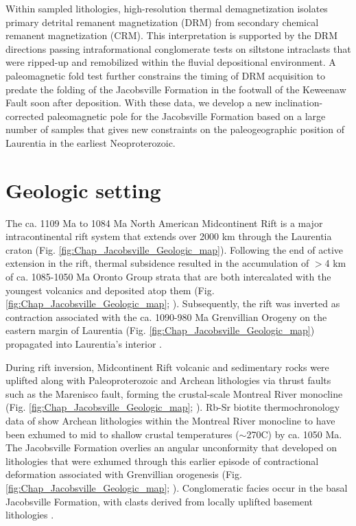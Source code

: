 Within sampled lithologies, high-resolution thermal demagnetization isolates primary detrital remanent magnetization (DRM) from secondary chemical remanent magnetization (CRM). This interpretation is supported by the DRM directions passing intraformational conglomerate tests on siltstone intraclasts that were ripped-up and remobilized within the fluvial depositional environment. A paleomagnetic fold test further constrains the timing of DRM acquisition to predate the folding of the Jacobsville Formation in the footwall of the Keweenaw Fault soon after deposition. With these data, we develop a new inclination-corrected paleomagnetic pole for the Jacobsville Formation based on a large number of samples that gives new constraints on the paleogeographic position of Laurentia in the earliest Neoproterozoic.

\section*{Geologic setting}

The ca. 1109 Ma to 1084 Ma North American Midcontinent Rift is a major intracontinental rift system that extends over 2000 km through the Laurentia craton (Fig. \ref{fig:Chap_Jacobsville_Geologic_map}). Following the end of active extension in the rift, thermal subsidence resulted in the accumulation of $>$4 km of ca. 1085-1050 Ma Oronto Group strata that are both intercalated with the youngest volcanics and deposited atop them (Fig. \ref{fig:Chap_Jacobsville_Geologic_map}; \cite{Daniels1982a, Cannon1989a}). Subsequently, the rift was inverted as contraction associated with the ca. 1090-980 Ma Grenvillian Orogeny on the eastern margin of Laurentia (Fig. \ref{fig:Chap_Jacobsville_Geologic_map}) propagated into Laurentia's interior \citep{Cannon1993a, Cannon1994a, Hodgin2022a, Swanson-Hysell2023a}. 

During rift inversion, Midcontinent Rift volcanic and sedimentary rocks were uplifted along with Paleoproterozoic and Archean lithologies via thrust faults such as the Marenisco fault, forming the crustal-scale Montreal River monocline (Fig. \ref{fig:Chap_Jacobsville_Geologic_map}; \cite{Cannon1993a}). Rb-Sr biotite thermochronology data of \cite{Cannon1993a} show Archean lithologies within the Montreal River monocline to have been exhumed to mid to shallow crustal temperatures ($\sim$270\textdegree C) by ca. 1050 Ma. The Jacobsville Formation overlies an angular unconformity that developed on lithologies that were exhumed through this earlier episode of contractional deformation associated with Grenvillian orogenesis (Fig. \ref{fig:Chap_Jacobsville_Geologic_map}; \cite{Hamblin1958a, Cannon1993a, Kalliokoski1982a}). Conglomeratic facies occur in the basal Jacobsville Formation, with clasts derived from locally uplifted basement lithologies \citep{Irving1885a, Hamblin1958a, Kalliokoski1982a}.

